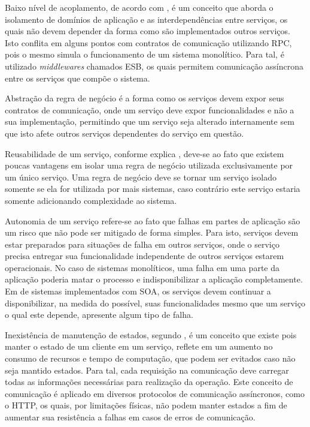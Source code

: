 Baixo nível de acoplamento, de acordo com , é um
conceito que aborda o isolamento de domínios de aplicação e as
interdependências entre serviços, os quais não devem depender da forma
como são implementados outros serviços. Isto conflita em alguns pontos
com contratos de comunicação utilizando \ac{RPC}, pois o mesmo simula
o funcionamento de um sistema monolítico. Para tal, é utilizado
\emph{middlewares} chamados \ac{ESB}, os quais permitem comunicação
assíncrona entre os serviços que compõe o sistema.

Abstração da regra de negócio é a forma como os serviços devem expor
seus contratos de comunicação, onde um serviço deve expor funcionalidades
e não a sua implementação, permitindo que um serviço seja alterado internamente
sem que isto afete outros serviços dependentes do serviço em questão.

Reusabilidade de um serviço, conforme explica , deve-se
ao fato que existem poucas vantagens em isolar uma regra de negócio utilizada
exclusivamente por um único serviço. Uma regra de negócio deve se tornar um
serviço isolado somente se ela for utilizada por mais sistemas, caso
contrário este serviço estaria somente adicionando complexidade ao sistema.

Autonomia de um serviço refere-se ao fato que falhas em partes de aplicação
são um risco que não pode ser mitigado de forma simples. Para isto, serviços
devem estar preparados para situações de falha em outros serviços, onde
o serviço precisa entregar sua funcionalidade independente de outros serviços
estarem operacionais. No caso de sistemas monolíticos, uma falha
em uma parte da aplicação poderia matar o processo e indisponibilizar
a aplicação completamente. Em de sistemas implementados com \ac{SOA}, os
serviços devem continuar a disponibilizar, na medida do possível, suas
funcionalidades mesmo que um serviço o qual este depende, apresente algum tipo
de falha.

Inexistência de manutenção de estados, segundo , é
um conceito que existe pois manter o estado de um cliente em um serviço,
reflete em um aumento no consumo de recursos e tempo de computação, que
podem ser evitados caso não seja mantido estados. Para tal, cada requisição
na comunicação deve carregar todas as informações necessárias para realização
da operação. Este conceito de comunicação é aplicado em diversos protocolos
de comunicação assíncronos, como o \ac{HTTP}, os quais, por limitações físicas,
não podem manter estados a fim de aumentar sua resistência a falhas em casos
de erros de comunicação.


